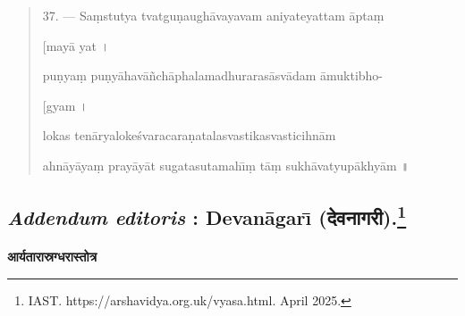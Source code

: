 \documentclass[a4paper, 11pt, oneside, french, landscape, twocolumn]{article}
\begin{document}
\begin{quotation}
\bigskip

37. --- Sa\d{m}stutya tvatgu\d{n}augh\={a}vayavam aniyateyattam \={a}pta\d{m}

\hspace*{55mm}[may\={a} yat \texthindi{।}

pu\d{n}ya\d{m} pu\d{n}y\={a}hav\={a}\~{n}ch\={a}phalamadhuraras\={a}sv\={a}dam \={a}muktibho-

\hspace*{55mm}[gyam \texthindi{।}

lokas ten\={a}ryaloke\'{s}varacara\d{n}atalasvastikasvasticihn\={a}m

ahn\={a}y\={a}ya\d{m} pray\={a}y\={a}t sugatasutamah\={\i}\d{m} t\={a}\d{m} sukh\={a}vatyup\={a}khy\={a}m \texthindi{॥}
\end{quotation}
\clearpage
\subsection[\emph{Addendum editoris} : Devan\={a}gar\={\i} \texthindi{(देवनागरी)}.]{\emph{Addendum editoris} : Devan\={a}gar\={\i} \texthindi{(देवनागरी)}.\footnote{IAST. https://arshavidya.org.uk/vyasa.html. April 2025.}}
\paragraph{}
\begin{center}
\texthindi{\textbf{आर्यतारास्रग्धरास्तोत्र}}
\end{center}
\end{document}
